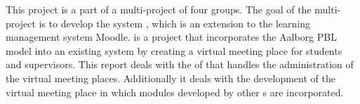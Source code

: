 This project is a part of a multi-project of four groups.
The goal of the multi-project is to develop the system \system{}, which is an extension to the learning management system Moodle.
\system{} is a project that incorporates the Aalborg PBL model into an existing system by creating a virtual meeting place for students and supervisors.
This report deals with the \subsystem{} of \system{} that handles the administration of the virtual meeting places.
Additionally it deals with the development of the virtual meeting place in which modules developed by other \subgroup{}s are incorporated.